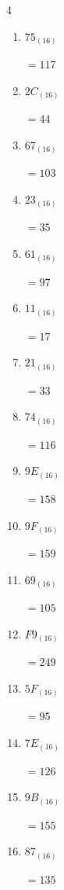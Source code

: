 \begin{multicols}{4}
\begin{enumerate}
        $=142$

  \item $75_{(16)}$

        $=117$

  \item $2C_{(16)}$

        $=44$

  \item $67_{(16)}$

        $=103$

\columnbreak %

  \item $23_{(16)}$

        $=35$

  \item $61_{(16)}$

        $=97$

  \item $11_{(16)}$

        $=17$

  \item $21_{(16)}$

        $=33$

  \item $74_{(16)}$

        $=116$

  \item $9E_{(16)}$

        $=158$

  \item $9F_{(16)}$

        $=159$

  \item $69_{(16)}$

        $=105$

  \item $F9_{(16)}$

        $=249$

  \item $5F_{(16)}$

        $=95$

  \item $7E_{(16)}$

        $=126$

  \item $9B_{(16)}$

        $=155$

  \item $87_{(16)}$

        $=135$


\end{enumerate}
\end{multicols}
